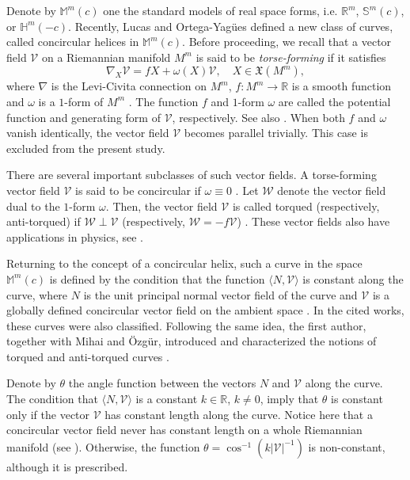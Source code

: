 \documentclass[12pt]{amsart}
\def\r{\mathbb R}
\def\m{\mathbb M}
\def\s{\mathbb S}
\def\h{\mathbb H}
\def\v{\mathcal V}
\def\w{\mathcal W}
\theoremstyle{definition}
\begin{document}
Denote by $\m^m(c)$ one the standard models of real space forms, i.e. $\r^m$, $\s^m(c)$, or $\h^m(-c)$. Recently, Lucas and Ortega-Yag\"ues \cite{loy4,loy5} defined a new class of curves, called concircular helices in $\m^m(c)$. Before proceeding, we recall that a vector field $\v$ on a Riemannian manifold $M^m$ is said to be {\it torse-forming} if it satisfies
\begin{equation*}
\nabla_X\v=fX+\omega(X) \v, \quad X\in \mathfrak{X}(M^m),
\end{equation*}
where $\nabla$ is the Levi-Civita connection on $M^m$, $f:M^m\to \r$ is a smooth function and $\omega$ is a $1$-form of $M^m$ \cite{ya0}. The function $f$ and $1$-form $\omega$ are called the potential function and generating form of $\v$, respectively. See also \cite{bo1,id,mih0}. When both $f$ and $\omega$ vanish identically, the vector field $\v$ becomes parallel trivially. This case is excluded from the present study.

There are several important subclasses of such vector fields. A torse-forming vector field $\v$ is said to be concircular if $\omega \equiv 0$  \cite{ya1}. Let $\w$ denote the vector field dual to the $1$-form $\omega$. Then, the vector field $\v$ is called torqued (respectively, anti-torqued) if $\w \perp \v$ (respectively, $\w = -f\v$) \cite{crs3,cs,dan,na}. These vector fields also have applications in physics, see \cite{c0,ds,mam1}.


Returning to the concept of a concircular helix, such a curve in the space $\m^m(c)$ is defined by the condition that the function $\langle N, \v \rangle$ is constant along the curve, where $N$ is the unit principal normal vector field of the curve and $\v$ is a globally defined concircular vector field on the ambient space \cite{loy4,loy5}. In the cited works, these curves were also classified. Following the same idea, the first author, together with Mihai and Özgür, introduced and characterized the notions of torqued and anti-torqued curves \cite{amc2}.

Denote by $\theta$ the angle function between the vectors $N$ and $\v$ along the curve. The condition that $\langle N, \v \rangle$ is a constant $k\in \r$, $k\neq 0$, imply that $\theta$ is constant only if the vector $\v$ has constant length along the curve. Notice here that a concircular vector field never has constant length on a whole Riemannian manifold (see \cite[Proposition 3.2]{amc}). Otherwise, the function $\theta=\cos^{-1}(k|\v|^{-1})$ is non-constant, although it is prescribed.
\end{document}
